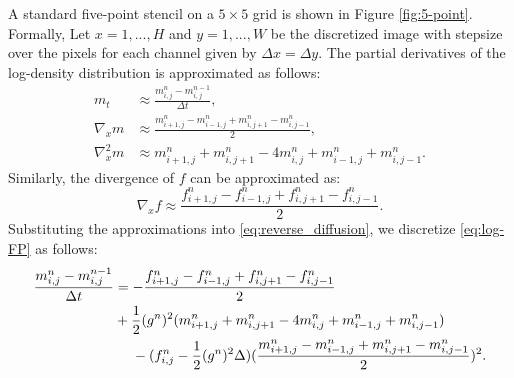 \documentclass[]{interact}
\theoremstyle{plain}%
\theoremstyle{definition}
\theoremstyle{remark}
\begin{document}
 A standard five-point stencil on a $5\times 5$ grid is shown in Figure \ref{fig:5-point}. Formally, Let $x = 1,..., H$ and $y = 1, ..., W$ be the discretized image with stepsize over the pixels for each channel given by $\Delta x = \Delta y$.  The partial derivatives of the log-density distribution is approximated as follows:
\begin{align}
    m_t &\approx \frac{m_{i,j}^{n} - m_{i,j}^{n-1}}{\Delta t},\nonumber \\
    \nabla_x m &\approx \frac{m_{i+1,j}^{n} - m_{i-1,j}^{n} + m_{i,j+1}^{n} - m_{i,j-1}^{n}}{2},\nonumber \\
    \nabla_x^2 m &\approx m_{i+1,j}^{n} + m_{i,j+1}^{n} - 4m_{i,j}^{n} + m_{i-1,j}^{n} + m_{i,j-1}^{n}.
\end{align}
Similarly, the divergence of $f$ can be approximated as:
\begin{equation}
    \nabla_x f \approx \frac{f_{i+1,j}^{n} - f_{i-1,j}^{n} + f_{i,j+1}^{n} - f_{i,j-1}^{n}}{2}.
\end{equation}
Substituting the approximations into \eqref{eq:reverse_diffusion}, we discretize \eqref{eq:log-FP} as follows:
\begin{align}
    \frac{m_{i,j}^{n} - m_{i,j}^{n-1}}{\Delta t} &= -\frac{f_{i+1,j}^{n} - f_{i-1,j}^{n} + f_{i,j+1}^{n} - f_{i,j-1}^{n}}{2} \nonumber \\ 
    &+ \frac{1}{2}(g^n)^2(m_{i+1,j}^{n} + m_{i,j+1}^{n} - 4m_{i,j}^{n} + m_{i-1,j}^{n} + m_{i,j-1}^{n})\nonumber \\ 
    & \hspace{0.45cm} - (f^n_{i,j} - \frac{1}{2}(g^n)^2\Delta)(\frac{m_{i+1,j}^{n} - m_{i-1,j}^{n} + m_{i,j+1}^{n} - m_{i,j-1}^{n}}{2})^2.
\end{align}
\end{document}
